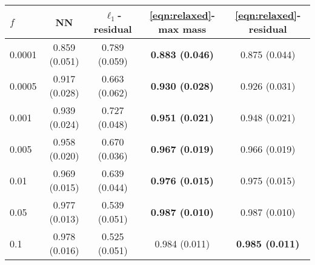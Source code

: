 \begin{tabular}{|l||c|c|c|c|}
\hline
$f$ & NN & $\ell_1$-residual & \eqref{eqn:relaxed}-max mass & \eqref{eqn:relaxed}-residual \\
\hline\hline
0.0001 & 0.859 (0.051) & 0.789 (0.059) & \textbf{0.883 (0.046)} & 0.875 (0.044) \\
\hline
0.0005 & 0.917 (0.028) & 0.663 (0.062) & \textbf{0.930 (0.028)} & 0.926 (0.031) \\
\hline
0.001 & 0.939 (0.024) & 0.727 (0.048) & \textbf{0.951 (0.021)} & 0.948 (0.021) \\
\hline
0.005 & 0.958 (0.020) & 0.670 (0.036) & \textbf{0.967 (0.019)} & 0.966 (0.019) \\
\hline
0.01 & 0.969 (0.015) & 0.639 (0.044) & \textbf{0.976 (0.015)} & 0.975 (0.015) \\
\hline
0.05 & 0.977 (0.013) & 0.539 (0.051) & \textbf{0.987 (0.010)} & 0.987 (0.010) \\
\hline
0.1 & 0.978 (0.016) & 0.525 (0.051) & 0.984 (0.011) & \textbf{0.985 (0.011)} \\
\hline
\end{tabular}